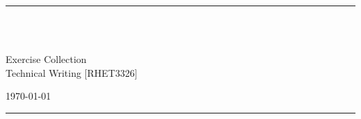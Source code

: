 \fancyhead[C]{}
\hrule \medskip
\begin{minipage}{0.295\textwidth}
\raggedright
\footnotesize
\yourname \hfill\\
\yournetid \hfill\\
\youremail
\end{minipage}
\begin{minipage}{0.4\textwidth}
\centering
\large
Exercise Collection \assignmentnumber\\
\normalsize
Technical Writing [RHET3326]\\
\end{minipage}
\begin{minipage}{0.295\textwidth}
\raggedleft
\today\hfill\\
\end{minipage}
\medskip\hrule
\bigskip
